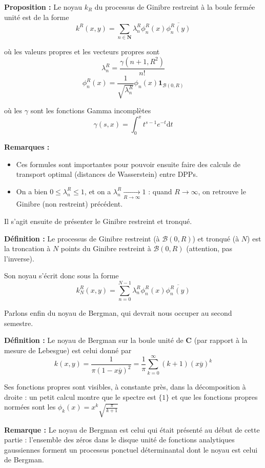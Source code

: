 \documentclass[12pt]{article}
\let\oldsum\sum
\renewcommand{\sum}{\oldsum\limits}
\begin{document}
\textbf{Proposition :} Le noyau $k_R $ du processus de Ginibre restreint à la boule fermée unité est de la forme $$ k^R(x,y) = \sum_{n \in \mathbf N} \lambda_n^R \phi_n^R(x) \overline{\phi_n^R(y)}$$

où les valeurs propres et les vecteurs propres sont $$ \lambda_n^R = \frac{\gamma(n+1,R^2)}{n!} $$  $$ \phi_n^R(x) = \frac{1}{\sqrt{\lambda_n^R}} \phi_n(x) \mathbf{1}_{\mathcal B(0,R)} $$

où les $ \gamma $ sont les fonctions Gamma incomplètes $$ \gamma(s,x) = \int_0^x t^{s-1} e^{-t} \mathrm d t $$

\textbf{Remarques :} 

\begin{itemize}
  
  \item Ces formules sont importantes pour pouvoir ensuite faire des calculs de transport optimal (distances de Wasserstein) entre DPPs.

  \item On a bien $ 0 \leqslant \lambda_n^R \leqslant 1 $, et on a $ \lambda_n^R \xrightarrow[R \to \infty]{} 1 $ : quand $R \to \infty $, on retrouve le Ginibre (non restreint) précédent.

\end{itemize}

Il s'agit ensuite de présenter le Ginibre restreint et tronqué. 

\textbf{Définition :} Le processus de Ginibre restreint (à $\mathcal B(0,R)$) et tronqué (à $N$) est la troncation à $N$ points du Ginibre restreint à $\mathcal B(0,R)$ (attention, pas l'inverse).

Son noyau s'écrit donc sous la forme $$ k^R_N(x,y) = \sum_{n = 0}^{N-1} \lambda_n^R \phi_n^R(x) \overline{\phi_n^R(y)} $$

Parlons enfin du noyau de Bergman, qui devrait nous occuper au second semestre.

\textbf{Définition :} Le noyau de Bergman sur la boule unité de $\mathbf C $ (par rapport à la mesure de Lebesgue) est celui donné par $$ k(x,y) = \frac{1}{\pi(1-x\overline y)^2} = \frac 1 \pi \sum_{k=0}^\infty (k+1)(x \overline y)^k $$

Ses fonctions propres sont visibles, à constante près, dans la décomposition à droite : un petit calcul montre que le spectre est $ \{ 1\}$ et que les fonctions propres normées sont les $ \phi_k(x) = x^k \sqrt{\frac{ \pi }{k + 1}}$

\textbf{Remarque :} Le noyau de Bergman est celui qui était présenté au début de cette partie : l'ensemble des zéros dans le disque unité de fonctions analytiques gaussiennes forment un processus ponctuel déterminantal dont le noyau est celui de Bergman.
\end{document}
